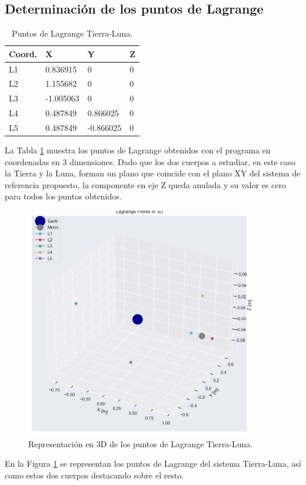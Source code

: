 \documentclass[12pt,a4paper]{article}
\begin{document}
\subsection{Determinación de los puntos de Lagrange} %
\begin{table}[H]
	\centering
	\caption{Puntos de Lagrange Tierra-Luna.}
	\begin{spacing}{1.2}
		\resizebox{0.4\textwidth}{!} {
			\begin{tabular}{|l|l|l|l|}
				\hline 
				Coord. 	& X  		& Y 		& Z \\ \hline \hline
				L1 		& 0.836915 	& 0 		& 0 \\ \hline
				L2 		& 1.155682 	& 0 		& 0 \\ \hline
				L3 		& -1.005063 & 0 		& 0 \\ \hline
				L4 		& 0.487849 	& 0.866025 	& 0 \\ \hline
				L5 		& 0.487849 	& -0.866025 & 0 \\ \hline
			\end{tabular}
		}
	\end{spacing}
	\label{lagr_points} 
\end{table}
La Tabla \ref{lagr_points} muestra los puntos de Lagrange obtenidos con el programa en coordenadas en 3 dimensiones. Dado que los dos cuerpos a estudiar, en este caso la Tierra y la Luna, forman un plano que coincide con el plano XY del sistema de referencia propuesto, la componente en eje Z queda anulada y su valor es cero para todos los puntos obtenidos.

\begin{figure}[H]
	\centering
	\includegraphics[width=0.90\textwidth]{FIGURES/mil6/langrage_points_erk_3D.png}
	\caption{Representación en 3D de los puntos de Lagrange Tierra-Luna.}
	\label{langrage_points_3D}
\end{figure}
En la Figura \ref{langrage_points_3D} se representan los puntos de Lagrange del sistema Tierra-Luna, así como estos dos cuerpos destacando sobre el resto.
\end{document}
